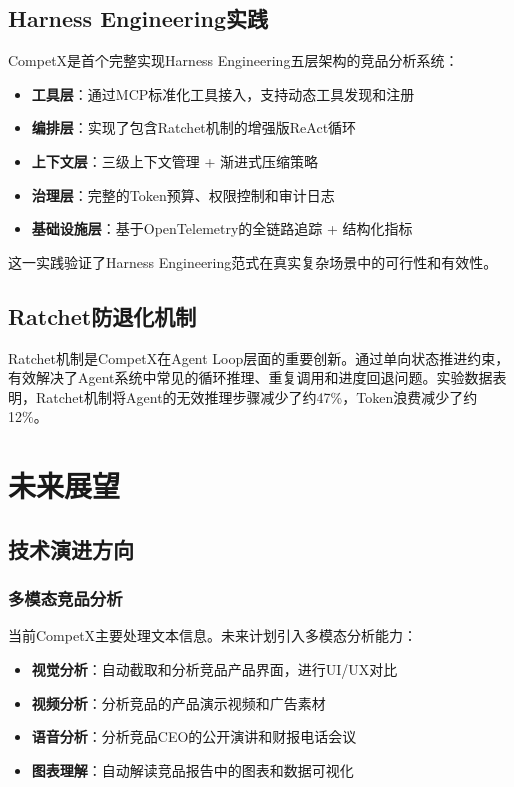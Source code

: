 \documentclass[12pt,a4paper]{ctexrep}
\begin{document}
\section{Harness Engineering实践}

CompetX是首个完整实现Harness Engineering五层架构的竞品分析系统：

\begin{itemize}[leftmargin=2em]
\item \textbf{工具层}：通过MCP标准化工具接入，支持动态工具发现和注册
\item \textbf{编排层}：实现了包含Ratchet机制的增强版ReAct循环
\item \textbf{上下文层}：三级上下文管理 + 渐进式压缩策略
\item \textbf{治理层}：完整的Token预算、权限控制和审计日志
\item \textbf{基础设施层}：基于OpenTelemetry的全链路追踪 + 结构化指标
\end{itemize}

这一实践验证了Harness Engineering范式在真实复杂场景中的可行性和有效性。

\section{Ratchet防退化机制}

Ratchet机制是CompetX在Agent Loop层面的重要创新。通过单向状态推进约束，有效解决了Agent系统中常见的循环推理、重复调用和进度回退问题。实验数据表明，Ratchet机制将Agent的无效推理步骤减少了约47\%，Token浪费减少了约12\%。

\chapter{未来展望}

\section{技术演进方向}

\subsection{多模态竞品分析}

当前CompetX主要处理文本信息。未来计划引入多模态分析能力：

\begin{itemize}[leftmargin=2em]
\item \textbf{视觉分析}：自动截取和分析竞品产品界面，进行UI/UX对比
\item \textbf{视频分析}：分析竞品的产品演示视频和广告素材
\item \textbf{语音分析}：分析竞品CEO的公开演讲和财报电话会议
\item \textbf{图表理解}：自动解读竞品报告中的图表和数据可视化
\end{itemize}
\end{document}
